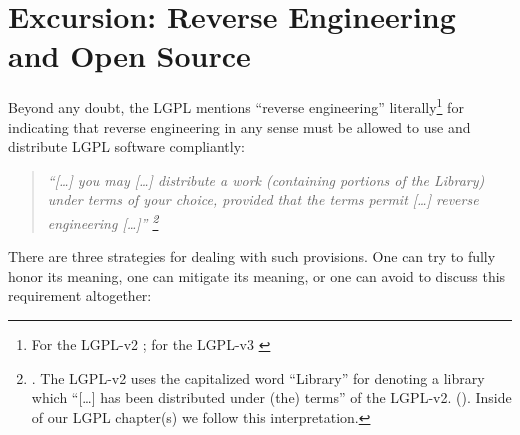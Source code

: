 %
%
%
%
%



\section{Excursion: Reverse Engineering and Open Source}

Beyond any doubt, the LGPL mentions \enquote{reverse engineering}
literally\footnote{For the LGPL-v2 \cite[cf.][\nopage wp.
§6]{Lgpl21OsiLicense1999a}; for the LGPL-v3 \cite[cf.][\nopage wp.
§4]{Lgpl30OsiLicense2007a} } for indicating that reverse engineering in any
sense must be allowed to use and distribute LGPL software compliantly:

\begin{quote}\noindent\emph{\enquote{[\ldots] you may [\ldots] distribute a work
(containing portions of the Library) under terms of your choice, provided that
the terms permit [\ldots] \emph{reverse engineering} [\ldots]}
\footnote{\cite[cf.][\nopage wp, §6]{Lgpl21OsiLicense1999a}. The LGPL-v2 uses
the capitalized word \enquote{Library} for denoting a library which
\enquote{[\ldots] has been distributed under (the) terms} of the LGPL-v2.
(\cite[cf.][\nopage wp, §0]{Lgpl21OsiLicense1999a}). Inside of our LGPL
chapter(s) we follow this interpretation. } }
\end{quote}

There are three strategies for dealing with such provisions. One can try to
fully honor its meaning, one can mitigate its meaning, or one can avoid to
discuss this requirement altogether:

